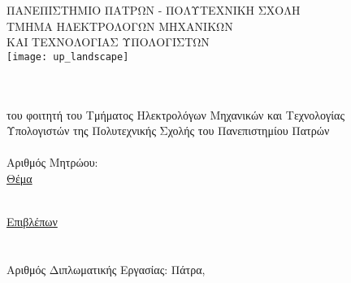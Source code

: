 
\begin{titlepage}
\begin{center}
\textsc{\large ΠΑΝΕΠΙΣΤΗΜΙΟ ΠΑΤΡΩΝ - ΠΟΛΥΤΕΧΝΙΚΗ ΣΧΟΛΗ\\
\large ΤΜΗΜΑ ΗΛΕΚΤΡΟΛΟΓΩΝ ΜΗΧΑΝΙΚΩΝ\\ΚΑΙ ΤΕΧΝΟΛΟΓΙΑΣ ΥΠΟΛΟΓΙΣΤΩΝ}\\[0.5cm]

\texttt{[image: up\_landscape]}\\[1cm]

\division \\
\lab \\[1cm]

\textsc{\uline{\LARGE{\shortdoctitle}}}

του φοιτητή του Τμήματος Ηλεκτρολόγων Μηχανικών και Τεχνολογίας\\
Υπολογιστών της Πολυτεχνικής Σχολής  του Πανεπιστημίου Πατρών\\[0.5cm]

\megeniki\\
Αριθμός Μητρώου: \studnum\\[0.5cm]

\uline{\large Θέμα}\\[0.5cm]

\begingroup
    \fontsize{17pt}{12pt}\selectfont
	\textbf{\doctitle }\\[1cm]
\endgroup

\uline{\large Επιβλέπων}\\[0.5cm]
\large \supname \, \\ \suptitle \\[1cm]
\large{Αριθμός Διπλωματικής Εργασίας: }\hspace{3cm}
\vfill
\large{Πάτρα, \monthyear}
\end{center}
\end{titlepage}
